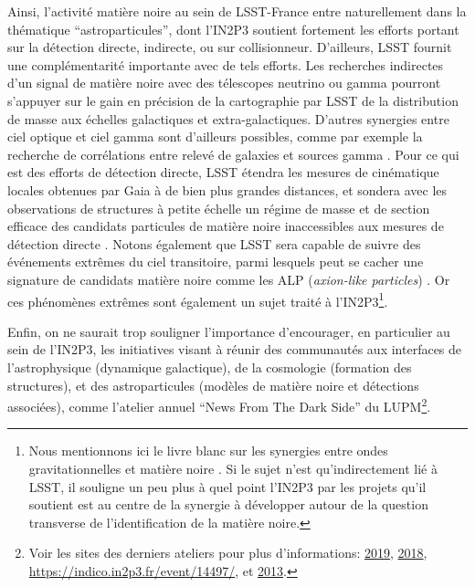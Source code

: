 \documentclass[12pt]{article}
\begin{document}
Ainsi, l'activité matière noire au sein de LSST-France entre naturellement dans la thématique ``astroparticules'', dont l'IN2P3 soutient fortement les efforts portant sur la détection directe, indirecte, ou sur collisionneur. D'ailleurs, LSST fournit une complémentarité importante avec de tels efforts. Les recherches indirectes d'un signal de matière noire avec des télescopes neutrino ou gamma \citep{Charles:2016,Albert:2017,1404.5503} pourront s'appuyer sur le gain en précision de la cartographie par LSST de la distribution de masse aux échelles galactiques et extra-galactiques. D'autres synergies entre ciel optique et ciel gamma sont d'ailleurs possibles, comme par exemple la recherche de corrélations entre relevé de galaxies et sources gamma \citep{2019arXiv190713484A}.
Pour ce qui est des efforts de détection directe, LSST étendra les mesures de cinématique locales obtenues par Gaia à de bien plus grandes distances, et sondera avec les observations de structures à petite échelle un régime de masse et de section efficace des candidats particules de matière noire inaccessibles aux mesures de détection directe \citep{drlica-wagner_2019_lsst_dark_matter}.
Notons également que LSST sera capable de suivre des événements extrêmes du ciel transitoire, parmi lesquels peut se cacher une signature de candidats matière noire comme les ALP ({\it axion-like particles}) \citep{2017PhRvL.118a1103M}. Or ces phénomènes extrêmes sont également un sujet traité à l'IN2P3\footnote{Nous mentionnons ici le livre blanc sur les synergies entre ondes gravitationnelles et matière noire \citep{2019arXiv190710610B}. Si le sujet n'est qu'indirectement lié à LSST, il souligne un peu plus à quel point l'IN2P3 par les projets qu'il soutient est au centre de la synergie à développer autour de la question transverse de l'identification de la matière noire.}.

Enfin, on ne saurait trop souligner l'importance d'encourager, en particulier au sein de l'IN2P3, les initiatives visant à réunir des communautés aux interfaces de l'astrophysique (dynamique galactique), de la cosmologie (formation des structures), et des astroparticules (modèles de matière noire et détections associées), comme l'atelier annuel ``News From The Dark Side'' du LUPM\footnote{Voir les sites des derniers ateliers pour plus d'informations: \href{https://indico.in2p3.fr/event/19035/}{2019}, \href{https://indico.in2p3.fr/event/17224/}{2018}, \href{https://indico.in2p3.fr/event/14497/}{https://indico.in2p3.fr/event/14497/}, et \href{https://indico.in2p3.fr/event/9143/}{2013}.}. 
\end{document}
